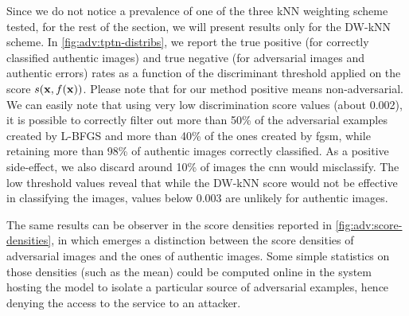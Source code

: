 Since we do not notice a prevalence of one of the three kNN weighting scheme tested, for the rest of the section, we will present results only for the DW-kNN scheme.
In \ref{fig:adv:tptn-distribs}, we report the true positive (for correctly classified authentic images) and true negative (for adversarial images and authentic errors) rates as a function of the discriminant threshold applied on the score $s(\mathbf{x}, f(\mathbf{x}))$.
Please note that for our method positive means non-adversarial.
We can easily note that using very low discrimination score values (about 0.002), it is possible to correctly filter out more than 50\% of the adversarial examples created by L-BFGS and more than 40\% of the ones created by \gls{fgsm}, while retaining more than 98\% of authentic images correctly classified.
As a positive side-effect, we also discard around 10\% of images the \gls{cnn} would misclassify.
The low threshold values reveal that while the DW-kNN score would not be effective in classifying the images, values below 0.003 are unlikely for authentic images.

The same results can be observer in the score densities reported in \ref{fig:adv:score-densities}, in which emerges a distinction between the score densities of adversarial images and the ones of authentic images.
Some simple statistics on those densities (such as the mean) could be computed online in the system hosting the model to isolate a particular source of adversarial examples, hence denying the access to the service to an attacker.

% 

